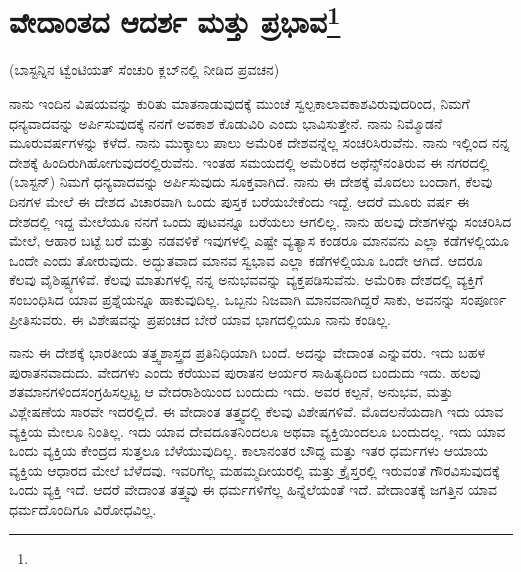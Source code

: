 
\chapter[ವೇದಾಂತದ ಆದರ್ಶ ಮತ್ತು ಪ್ರಭಾವ]{ವೇದಾಂತದ ಆದರ್ಶ ಮತ್ತು ಪ್ರಭಾವ\protect\footnote{}}

\begin{center}
(ಬಾಸ್ಟನ್ನಿನ ಟ್ವೆಂಟಿಯತ್ ಸೆಂಚುರಿ ಕ್ಲಬ್‌ನಲ್ಲಿ ನೀಡಿದ ಪ್ರವಚನ)
\end{center}

ನಾನು ಇಂದಿನ ವಿಷಯವನ್ನು ಕುರಿತು ಮಾತನಾಡುವುದಕ್ಕೆ ಮುಂಚೆ ಸ್ವಲ್ಪ\break ಕಾಲಾವಕಾಶವಿರುವುದರಿಂದ, ನಿಮಗೆ ಧನ್ಯವಾದವನ್ನು ಅರ್ಪಿಸುವುದಕ್ಕೆ ನನಗೆ ಅವಕಾಶ ಕೊಡುವಿರಿ ಎಂದು ಭಾವಿಸುತ್ತೇನೆ. ನಾನು ನಿಮ್ಮೊಡನೆ ಮೂರುವರ್ಷಗಳನ್ನು ಕಳೆದೆ. ನಾನು ಮುಕ್ಕಾಲು ಪಾಲು ಅಮೆರಿಕ ದೇಶವನ್ನೆಲ್ಲ ಸಂಚರಿಸಿರುವೆನು. ನಾನು ಇಲ್ಲಿಂದ ನನ್ನ ದೇಶಕ್ಕೆ ಹಿಂದಿರುಗಿಹೋಗುವುದರಲ್ಲಿರುವೆನು. ಇಂತಹ ಸಮಯದಲ್ಲಿ ಅಮೆರಿಕದ ಅಥೆನ್ಸ್‌ನಂತಿರುವ ಈ ನಗರದಲ್ಲಿ (ಬಾಸ್ಟನ್) ನಿಮಗೆ ಧನ್ಯವಾದವನ್ನು ಅರ್ಪಿಸುವುದು ಸೂಕ್ತವಾಗಿದೆ. ನಾನು ಈ ದೇಶಕ್ಕೆ ಮೊದಲು ಬಂದಾಗ, ಕೆಲವು ದಿನಗಳ ಮೇಲೆ ಈ ದೇಶದ ವಿಚಾರವಾಗಿ ಒಂದು ಪುಸ್ತಕ ಬರೆಯಬೇಕೆಂದು ಇದ್ದೆ. ಆದರೆ ಮೂರು ವರ್ಷ ಈ ದೇಶದಲ್ಲಿ ಇದ್ದ ಮೇಲೆಯೂ ನನಗೆ ಒಂದು ಪುಟವನ್ನೂ ಬರೆಯಲು ಆಗಲಿಲ್ಲ. ನಾನು ಹಲವು ದೇಶಗಳನ್ನು ಸಂಚರಿಸಿದ ಮೇಲೆ, ಆಹಾರ ಬಟ್ಟೆ ಬರೆ ಮತ್ತು ನಡವಳಿಕೆ ಇವುಗಳಲ್ಲಿ ಎಷ್ಟೇ ವ್ಯತ್ಯಾಸ ಕಂಡರೂ ಮಾನವನು ಎಲ್ಲಾ ಕಡೆಗಳಲ್ಲಿಯೂ ಒಂದೇ ಎಂದು ತೋರುವುದು. ಅದ್ಭುತವಾದ ಮಾನವ ಸ್ವಭಾವ ಎಲ್ಲಾ ಕಡೆಗಳಲ್ಲಿಯೂ ಒಂದೇ ಆಗಿದೆ. ಆದರೂ ಕೆಲವು ವೈಶಿಷ್ಟ್ಯಗಳಿವೆ. ಕೆಲವು ಮಾತುಗಳಲ್ಲಿ ನನ್ನ ಅನುಭವವನ್ನು ವ್ಯಕ್ತಪಡಿಸುವೆನು. ಅಮೆರಿಕಾ ದೇಶದಲ್ಲಿ ವ್ಯಕ್ತಿಗೆ ಸಂಬಂಧಿಸಿದ ಯಾವ ಪ್ರಶ್ನೆಯನ್ನೂ ಹಾಕುವುದಿಲ್ಲ. ಒಬ್ಬನು ನಿಜವಾಗಿ ಮಾನವನಾಗಿದ್ದರೆ ಸಾಕು, ಅವನನ್ನು ಸಂಪೂರ್ಣ ಪ್ರೀತಿಸುವರು. ಈ ವಿಶೇಷವನ್ನು ಪ್ರಪಂಚದ ಬೇರೆ ಯಾವ ಭಾಗದಲ್ಲಿಯೂ ನಾನು ಕಂಡಿಲ್ಲ.

\vskip 2pt

ನಾನು ಈ ದೇಶಕ್ಕೆ ಭಾರತೀಯ ತತ್ತ್ವಶಾಸ್ತ್ರದ ಪ್ರತಿನಿಧಿಯಾಗಿ ಬಂದೆ. ಅದನ್ನು ವೇದಾಂತ ಎನ್ನುವರು. ಇದು ಬಹಳ ಪುರಾತನವಾದುದು. ವೇದಗಳು ಎಂದು ಕರೆಯುವ ಪುರಾತನ ಆರ್ಯರ ಸಾಹಿತ್ಯದಿಂದ ಬಂದುದು ಇದು. ಹಲವು ಶತಮಾನಗಳಿಂದ\break ಸಂಗ್ರಹಿಸಲ್ಪಟ್ಟ ಆ ವೇದರಾಶಿಯಿಂದ ಬಂದುದು ಇದು. ಅವರ ಕಲ್ಪನೆ, ಅನುಭವ, ಮತ್ತು ವಿಶ್ಲೇಷಣೆಯ ಸಾರವೇ ಇದರಲ್ಲಿದೆ. ಈ ವೇದಾಂತ ತತ್ತ್ವದಲ್ಲಿ ಕೆಲವು ವಿಶೇಷಗಳಿವೆ. ಮೊದಲನೆಯದಾಗಿ ಇದು ಯಾವ ವ್ಯಕ್ತಿಯ ಮೇಲೂ ನಿಂತಿಲ್ಲ. ಇದು ಯಾವ ದೇವದೂತನಿಂದಲೂ ಅಥವಾ ವ್ಯಕ್ತಿಯಿಂದಲೂ ಬಂದುದಲ್ಲ. ಇದು ಯಾವ ಒಂದು ವ್ಯಕ್ತಿಯ ಕೇಂದ್ರದ ಸುತ್ತಲೂ ಬೆಳೆಯುವುದಿಲ್ಲ. ಕಾಲಾನಂತರ ಬೌದ್ದ ಮತ್ತು ಇತರ ಧರ್ಮಗಳು ಆಯಾಯ ವ್ಯಕ್ತಿಯ ಆಧಾರದ ಮೇಲೆ ಬೆಳೆದವು. ಇವರಿಗೆಲ್ಲ ಮಹಮ್ಮದೀಯರಲ್ಲಿ ಮತ್ತು ಕ್ರೈಸ್ತರಲ್ಲಿ ಇರುವಂತೆ ಗೌರವಿಸುವುದಕ್ಕೆ ಒಂದು ವ್ಯಕ್ತಿ ಇದೆ. ಆದರೆ ವೇದಾಂತ ತತ್ತ್ವವು ಈ ಧರ್ಮಗಳಿಗೆಲ್ಲ ಹಿನ್ನೆಲೆಯಂತೆ ಇದೆ. ವೇದಾಂತಕ್ಕೆ ಜಗತ್ತಿನ ಯಾವ ಧರ್ಮದೊಂದಿಗೂ ವಿರೋಧವಿಲ್ಲ.

\vskip 2pt

